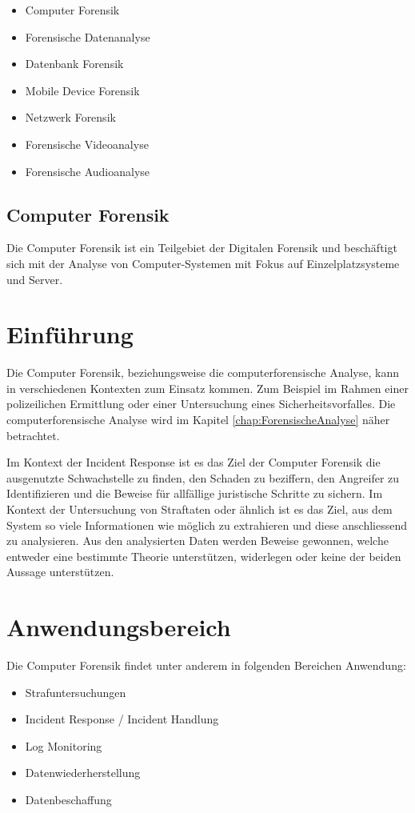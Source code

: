 \begin{itemize}
\item Computer Forensik
\item Forensische Datenanalyse
\item Datenbank Forensik
\item Mobile Device Forensik
\item Netzwerk Forensik
\item Forensische Videoanalyse
\item Forensische Audioanalyse

\end{itemize}


\subsection{Computer Forensik}
Die Computer Forensik ist ein Teilgebiet der Digitalen Forensik und beschäftigt sich mit der Analyse von Computer-Systemen mit Fokus auf Einzelplatzsysteme und Server.

\section{Einführung}
Die Computer Forensik, beziehungsweise die computerforensische Analyse, kann in verschiedenen Kontexten zum Einsatz kommen. Zum Beispiel im Rahmen einer polizeilichen Ermittlung oder einer Untersuchung eines Sicherheitsvorfalles. Die computerforensische Analyse wird im Kapitel \ref{chap:ForensischeAnalyse}  näher betrachtet.

Im Kontext der Incident Response ist es das Ziel der Computer Forensik die ausgenutzte Schwachstelle zu finden, den Schaden zu beziffern, den Angreifer zu Identifizieren und die Beweise für allfällige juristische Schritte zu sichern. Im Kontext der Untersuchung von Straftaten oder ähnlich ist es das Ziel, aus dem System so viele Informationen wie möglich zu extrahieren und diese anschliessend zu analysieren. Aus den analysierten Daten werden Beweise gewonnen, welche entweder eine bestimmte Theorie unterstützen, widerlegen oder keine der beiden Aussage unterstützen. 


\section{Anwendungsbereich}
Die Computer Forensik findet unter anderem in folgenden Bereichen Anwendung:

\begin{itemize}
\item Strafuntersuchungen
\item Incident Response / Incident Handlung
\item Log Monitoring
\item Datenwiederherstellung
\item Datenbeschaffung
\end{itemize}


